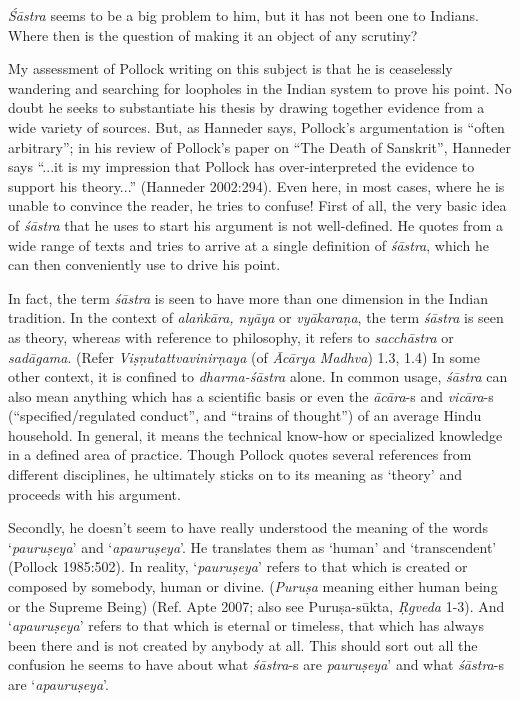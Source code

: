 {\sl Śāstra} seems to be a big problem to him, but it has not been one to Indians. Where then is the question of making it an object of any scrutiny? 

My assessment of Pollock writing on this subject is that he is ceaselessly wandering and searching for loopholes in the Indian system to prove his point. No doubt he seeks to substantiate his thesis by drawing together evidence from a wide variety of sources. But, as Hanneder says, Pollock's argumentation is ``often arbitrary''; in his review of Pollock's paper on ``The Death of Sanskrit'', Hanneder says ``...it is my impression that Pollock has over-interpreted the evidence to support his theory...'' (Hanneder 2002:294). Even here, in most cases, where he is unable to convince the reader, he tries to confuse! First of all, the very basic idea of {\it śāstra} that he uses to start his argument is not well-defined. He quotes from a wide range of texts and tries to arrive at a single definition of {\it śāstra}, which he can then conveniently use to drive his point. 

In fact, the term {\it śāstra} is seen to have more than one dimension in the Indian tradition. In the context of {\it alaṅkāra, nyāya} or {\it vyākaraṇa}, the term {\it śāstra} is seen as theory, whereas with reference to philosophy, it refers to {\it sacchāstra} or {\it sadāgama}. (Refer {\it Viṣṇutattvavinirṇaya} (of {\it Ācārya Madhva}) 1.3, 1.4)  In some other context, it is confined to {\it dharma-śāstra} alone. In common usage, {\it śāstra} can also mean anything which has a scientific basis or even the {\it ācāra}-s and {\it vicāra}-s (``specified/regulated conduct'', and ``trains of thought'') of an average Hindu household. In general, it means the technical know-how or specialized knowledge in a defined area of practice. Though Pollock quotes several references from different disciplines, he ultimately sticks on to its meaning as `theory' and proceeds with his argument. 

Secondly, he doesn't seem to have really understood the meaning of the words `{\it pauruṣeya}' and `{\it apauruṣeya}'. He translates them as `human' and `transcendent' (Pollock 1985:502). In reality, `{\it pauruṣeya}' refers to that which is created or composed by somebody, human or divine. ({\it Puruṣa} meaning either human being or the Supreme Being) (Ref. Apte 2007; also see Puruṣa-sūkta, {\it Ṛgveda} 1-3). And `{\it apauruṣeya}' refers to that which is eternal or timeless, that which has always been there and is not created by anybody at all. This should sort out all the confusion he seems to have about what {\it śāstra}-s are {\it pauruṣeya}' and what {\it śāstra}-s are `{\it apauruṣeya}'. 

